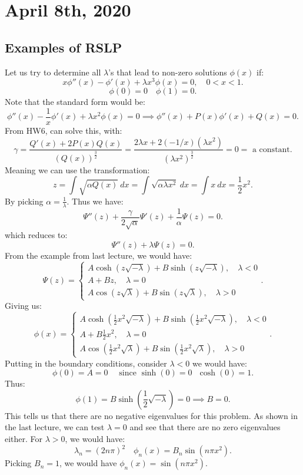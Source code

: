 \documentclass[../main/main.tex]{subfiles}
\begin{document}
\section{April 8th, 2020}
\subsection{Examples of RSLP}
Let us try to determine all $\lambda $'s that lead to non-zero solutions $\phi(x)$ if: \[
	x\phi''(x) -\phi'(x) + \lambda x^{3}\phi(x) = 0, \quad 0 < x < 1
.\] \[
\phi(0) = 0 \quad \phi(1) = 0
.\] Note that the standard form would be: \[
\phi''(x) -\frac{1}{x}\phi'(x) + \lambda x^{2}\phi(x) = 0 \implies \phi''(x) + P(x)\phi'(x) + Q(x) = 0
.\] From HW6, can solve this, with: \[
\gamma =  \frac{Q'(x) + 2P(x) Q(x)}{\left( Q(x) \right) ^{\frac{3}{2}}} = \frac{2\lambda x + 2 (-1 / x) (\lambda x^2)}{(\lambda x^2)^{\frac{3}{2}}} = 0 = \text{ a constant}
.\] Meaning we can use the transformation: \[
z = \int \sqrt{\alpha Q(x)}  ~dx = \int \sqrt{ \alpha \lambda x^2} ~dx = \int x~dx = \frac{1}{2}x^2
.\] By picking $\alpha=\frac{1}{\lambda}$. Thus we have: \[
\Psi''(z) + \frac{\gamma}{2\sqrt{\alpha} }\Psi'(z) + \frac{1}{\alpha}\Psi(z) = 0
.\] which reduces to: \[
\Psi''(z) + \lambda \Psi(z) = 0
.\] From the example from last lecture, we would have: \[
\Psi(z) = \begin{cases}
	A \cosh(z\sqrt{-\lambda} ) + B \sinh(z\sqrt{-\lambda} ),\quad \lambda < 0\\
	A+Bz , \quad\lambda = 0\\
	A \cos(z \sqrt{\lambda} ) + B \sin(z \sqrt{ \lambda} ),\quad \lambda >0
\end{cases}
.\] Giving us:  \[
\phi(x) = \begin{cases}
	A \cosh(\frac{1}{2}x^2\sqrt{-\lambda} ) + B \sinh(\frac{1}{2}x^2\sqrt{-\lambda} ),\quad \lambda < 0\\
	A+B \frac{1}{2}x^2,\quad \lambda = 0\\
	A \cos(\frac{1}{2}x^2\sqrt{\lambda} ) + B \sin(\frac{1}{2}x^2 \sqrt{ \lambda} ),\quad \lambda >0
\end{cases} 
.\] 
Putting in the boundary conditions, consider $\lambda<0$ we would have:
\[
	\phi(0) = A = 0\quad \text{ since $\sinh(0) = 0$ $\cosh(0) = 1$}
.\] Thus: \[
\phi(1) = B \sinh(\frac{1}{2}\sqrt{-\lambda} ) = 0 \implies B = 0
.\] This tells us that there are no negative eigenvalues for this problem. As shown in the last lecture, we can test $\lambda=0$ and see that there are no zero eigenvalues either. For $\lambda>0$, we would have: \[
\lambda_n = (2n\pi)^2 \quad \phi_n(x) = B_n \sin(n\pi x^2)
.\] Picking $B_n=1$, we would have $\phi_n(x) = \sin(n\pi x^2)$.
\end{document}
